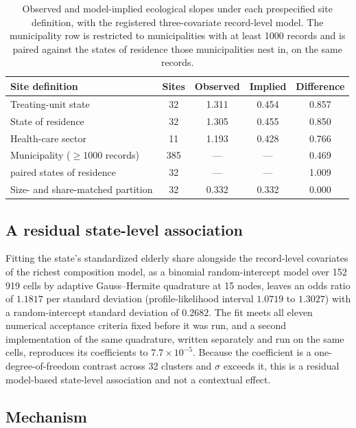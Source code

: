 \documentclass[11pt]{article}
\begin{document}
\begin{table}[t]
\centering
\caption{Observed and model-implied ecological slopes under each
prespecified site definition, with the registered three-covariate
record-level model.  The municipality row is restricted to municipalities
with at least 1000 records and is paired against the states of residence
those municipalities nest in, on the same records.}
\label{tab:sites}
\begin{tabular}{lcccc}
\toprule
Site definition & Sites & Observed & Implied & Difference \\
\midrule
Treating-unit state        & 32  & 1.311 & 0.454 & 0.857 \\
State of residence         & 32  & 1.305 & 0.455 & 0.850 \\
Health-care sector         & 11  & 1.193 & 0.428 & 0.766 \\
Municipality ($\geq$1000 records) & 385 & ---   & ---   & 0.469 \\
\;\;paired states of residence    & 32  & ---   & ---   & 1.009 \\
Size- and share-matched partition & 32  & 0.332 & 0.332 & 0.000 \\
\bottomrule
\end{tabular}
\end{table}

\subsection{A residual state-level association}

Fitting the state's standardized elderly share alongside the
record-level covariates of the richest composition model, as a binomial
random-intercept model over 152\,919 cells by adaptive Gauss--Hermite
quadrature at 15 nodes, leaves an odds ratio of $1.1817$ per standard
deviation (profile-likelihood interval $1.0719$ to $1.3027$) with a
random-intercept standard deviation of $0.2682$.  The fit meets all
eleven numerical acceptance criteria fixed before it was run, and a
second implementation of the same quadrature, written separately and
run on the same cells, reproduces its coefficients to
$7.7\times10^{-5}$.  Because the coefficient is a one-degree-of-freedom
contrast across 32 clusters and $\sigma$ exceeds it, this is a residual
model-based state-level association and not a contextual effect.

\subsection{Mechanism}
\label{sec:why}
\end{document}
